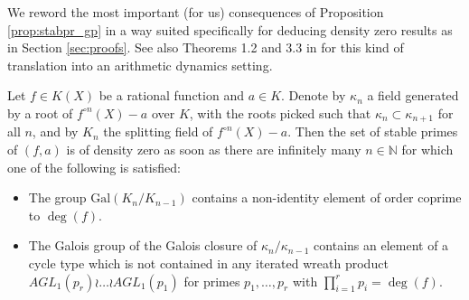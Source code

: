 \documentclass[a4paper]{amsart}
\begin{document}
 
   
  
  
  We reword the most important (for us) consequences of Proposition \ref{prop:stabpr_gp} in a way suited specifically for deducing density zero results as in Section \ref{sec:proofs}.
  See also Theorems 1.2 and 3.3 in \cite{Koe24} for this kind of translation into an arithmetic dynamics setting.
    \begin{corollary}
  \label{cor:stabpr}
  Let $f\in K(X)$ be a rational function  and $a\in K$. Denote by $\kappa_n$ a field generated by a root of $f^{\circ n}(X)-a$ over $K$, with the roots picked such that $\kappa_n\subset \kappa_{n+1}$ for all $n$, and by $K_n$ the splitting field of $f^{\circ n}(X)-a$. Then the set of stable primes of $(f,a)$ is of density zero as soon as there are infinitely many $n\in \mathbb{N}$ for which one of the following is satisfied:
  \begin{itemize}
 \item[a)]
 The group $\mathrm{Gal}(K_n/K_{n-1})$ contains a non-identity element of order coprime to $\deg(f)$.
 \item[b)] The Galois group of the Galois closure of $\kappa_n/\kappa_{n-1}$ contains an element of a cycle type which is not contained in any iterated wreath product $AGL_1(p_r)\wr\dots \wr AGL_1(p_1)$ for primes $p_1,\dots, p_r$ with $\prod_{i=1}^r p_i=\deg(f)$.
  \end{itemize}
  \end{corollary}
\end{document}
